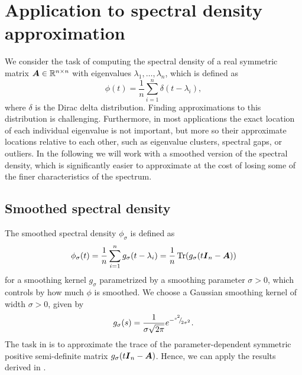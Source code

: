 \documentclass[12pt]{article}
\begin{document}
\section{Application to spectral density approximation}
\label{sec:application}

We consider the task of computing the spectral density of a real symmetric matrix $\boldsymbol{A} \in \mathbb{R}^{n \times n}$ with eigenvalues $\lambda_1, \dots, \lambda_n$, which is defined as
\begin{equation}
    \phi(t) = \frac{1}{n} \sum_{i=1}^{n} \delta(t - \lambda_i),
    \label{equ:spectral-density}
\end{equation}
where $\delta$ is the Dirac delta distribution. Finding approximations to this distribution is challenging. Furthermore, in most applications the exact location of each individual eigenvalue is not important, but more so their approximate locations relative to each other, such as eigenvalue clusters, spectral gaps, or outliers. In the following we will work with a smoothed version of the spectral density, which is significantly easier to approximate at the cost of losing some of the finer characteristics of the spectrum.

\subsection{Smoothed spectral density}
\label{subsec:spectral-density}

The smoothed spectral density $\phi_{\sigma}$ is defined as
\begin{equation}
    \phi_{\sigma}(t) = \frac{1}{n} \sum_{i=1}^{n} g_{\sigma}(t - \lambda_i) = \frac{1}{n} \operatorname{Tr}(g_{\sigma}(t\boldsymbol{I}_n - \boldsymbol{A}))
    \label{equ:smooth-spectral-density}
\end{equation}
for a smoothing kernel $g_{\sigma}$ parametrized by a smoothing parameter $\sigma > 0$, which controls by how much $\phi$ is smoothed. We choose a Gaussian smoothing kernel of width $\sigma > 0$, given by
\begin{equation}
    g_{\sigma}(s) = \frac{1}{\sigma \sqrt{2\pi}} e^{-{}^{s^2}{\mskip -5mu/\mskip -3mu}_{2\sigma^2}}.
    \label{equ:smoothing-kernel}
\end{equation}
The task in  is to approximate the trace of the parameter-dependent symmetric positive semi-definite matrix $g_{\sigma}(t\boldsymbol{I}_n - \boldsymbol{A})$. Hence, we can apply the results derived in .
\end{document}
